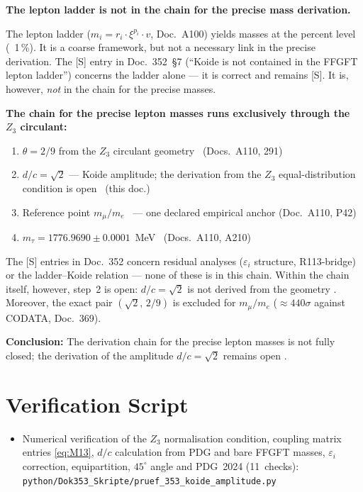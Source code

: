 \textbf{The lepton ladder is not in the chain for the precise mass derivation.}

The lepton ladder ($m_i = r_i\cdot\xi^{p_i}\cdot v$, Doc.~A100) yields masses
at the percent level (~1\,\%). It is a coarse framework, but not a necessary
link in the precise derivation. The [S] entry in Doc.~352~\S7
(``Koide is not contained in the FFGFT lepton ladder'') concerns the ladder
alone --- it is correct and remains [S]. It is, however, \emph{not} in the
chain for the precise masses.

\textbf{The chain for the precise lepton masses runs exclusively through the
$Z_3$ circulant:}

\begin{enumerate}
  \item $\theta = 2/9$ from the $Z_3$ circulant geometry \KM\ (Docs.~A110, 291)
  \item $d/c = \sqrt{2}$ --- Koide amplitude; the derivation from the
        $Z_3$ equal-distribution condition is open \SM\ (this doc.)
  \item Reference point $m_\mu/m_e$ \QM\ --- one declared empirical anchor
        (Doc.~A110, P42)
  \item $m_\tau = 1776.9690 \pm 0.0001$~MeV \KM\ (Docs.~A110, A210)
\end{enumerate}

The [S] entries in Doc.~352 concern residual analyses ($\varepsilon_i$
structure, R113-bridge) or the ladder--Koide relation --- none of these is in
this chain. Within the chain itself, however, step~2 is open: $d/c = \sqrt{2}$
is not derived from the geometry \SM. Moreover, the exact pair
$(\sqrt{2},\,2/9)$ is excluded for $m_\mu/m_e$ (${\approx}440\sigma$ against
CODATA, Doc.~369).

\textbf{Conclusion:} The derivation chain for the precise lepton masses is not
fully closed; the derivation of the amplitude $d/c = \sqrt{2}$ remains open \SM.

\section{Verification Script}

\begin{itemize}[leftmargin=2em,itemsep=2pt,topsep=2pt]
  \item Numerical verification of the $Z_3$ normalisation condition,
    coupling matrix entries \eqref{eq:M13}, $d/c$ calculation from PDG
    and bare FFGFT masses, $\varepsilon_i$ correction, equipartition,
    $45^\circ$ angle and PDG~2024 (11~checks):
    \texttt{python/Dok353\_Skripte/pruef\_353\_koide\_amplitude.py}
\end{itemize}

